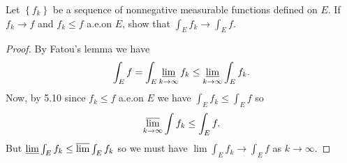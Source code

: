 \begin{problem}
Let $\left\{f_k\right\}$ be a sequence of nonnegative measurable functions
defined on $E$. If $f_k\to f$ and $f_k\leq f$ a.e.\@ on $E$, show that
$\int_E f_k\to\int_E f$.
\end{problem}
\begin{proof}
By Fatou's lemma we have
\begin{equation}
  \label{eq:fatou-lower-bound}
\int_E f=\int_E\varliminf_{k\to\infty} f_k\leq\varliminf_{k\to\infty}\int_E f_k.
\end{equation}
Now, by 5.10 since $f_k\leq f$ a.e.\@ on $E$ we have $\int_E
f_k\leq\int_E f$ so
\begin{equation}
  \label{eq:upper-bound}
\varlimsup_{k\to\infty}\int f_k\leq\int_E f.
\end{equation}
But $\varliminf\int_E f_k\leq\varlimsup\int_E f_k$ so we must have
$\lim\int_E f_k\to\int_E f$ as $k\to\infty$.
\end{proof}

